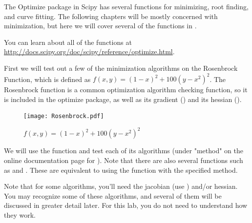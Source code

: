 \label{lab:Optimization1}

The Optimize package in Scipy has several functions for minimizing, root finding, and curve fitting. The following chapters will be mostly concerned with minimization, but here we will cover several of the functions in .

You can learn about all of the functions at \url{http://docs.scipy.org/doc/scipy/reference/optimize.html}.

First we will test out a few of the minimization algorithms on the Rosenbrock Function, which is defined as $f(x,y) = (1-x)^2 + 100(y-x^2)^2$.
The Rosenbrock function is a common optimization algorithm checking function, so it is included in the optimize package, as well as its gradient () and its hessian ().

\begin{figure}
\texttt{[image: Rosenbrock.pdf]}
\caption{$f(x,y) = (1-x)^2 + 100(y-x^2)^2$}
\label{opt:rosenbrock}
\end{figure}

We will use the  function and test each of its algorithms (under "method" on the online documentation page for ). Note that there are also several functions such as  and . These are equivalent to using the  function with the specified method.

Note that for some algorithms, you'll need the jacobian (use ) and/or hessian.
You may recognize some of these algorithms, and several of them will be discussed in greater detail later. For this lab, you do not need to understand how they work.

